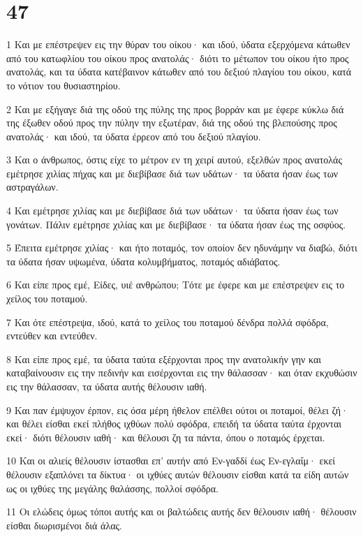 \chapter{47}

\par 1 Και με επέστρεψεν εις την θύραν του οίκου· και ιδού, ύδατα εξερχόμενα κάτωθεν από του κατωφλίου του οίκου προς ανατολάς· διότι το μέτωπον του οίκου ήτο προς ανατολάς, και τα ύδατα κατέβαινον κάτωθεν από του δεξιού πλαγίου του οίκου, κατά το νότιον του θυσιαστηρίου.
\par 2 Και με εξήγαγε διά της οδού της πύλης της προς βορράν και με έφερε κύκλω διά της έξωθεν οδού προς την πύλην την εξωτέραν, διά της οδού της βλεπούσης προς ανατολάς· και ιδού, τα ύδατα έρρεον από του δεξιού πλαγίου.
\par 3 Και ο άνθρωπος, όστις είχε το μέτρον εν τη χειρί αυτού, εξελθών προς ανατολάς εμέτρησε χιλίας πήχας και με διεβίβασε διά των υδάτων· τα ύδατα ήσαν έως των αστραγάλων.
\par 4 Και εμέτρησε χιλίας και με διεβίβασε διά των υδάτων· τα ύδατα ήσαν έως των γονάτων. Πάλιν εμέτρησε χιλίας και με διεβίβασε· τα ύδατα ήσαν έως της οσφύος.
\par 5 Έπειτα εμέτρησε χιλίας· και ήτο ποταμός, τον οποίον δεν ηδυνάμην να διαβώ, διότι τα ύδατα ήσαν υψωμένα, ύδατα κολυμβήματος, ποταμός αδιάβατος.
\par 6 Και είπε προς εμέ, Είδες, υιέ ανθρώπου; Τότε με έφερε και με επέστρεψεν εις το χείλος του ποταμού.
\par 7 Και ότε επέστρεψα, ιδού, κατά το χείλος του ποταμού δένδρα πολλά σφόδρα, εντεύθεν και εντεύθεν.
\par 8 Και είπε προς εμέ, τα ύδατα ταύτα εξέρχονται προς την ανατολικήν γην και καταβαίνουσιν εις την πεδινήν και εισέρχονται εις την θάλασσαν· και όταν εκχυθώσιν εις την θάλασσαν, τα ύδατα αυτής θέλουσιν ιαθή.
\par 9 Και παν έμψυχον έρπον, εις όσα μέρη ήθελον επέλθει ούτοι οι ποταμοί, θέλει ζή· και θέλει είσθαι εκεί πλήθος ιχθύων πολύ σφόδρα, επειδή τα ύδατα ταύτα έρχονται εκεί· διότι θέλουσιν ιαθή· και θέλουσι ζη τα πάντα, όπου ο ποταμός έρχεται.
\par 10 Και οι αλιείς θέλουσιν ίστασθαι επ' αυτήν από Εν-γαδδί έως Εν-εγλαΐμ· εκεί θέλουσιν εξαπλόνει τα δίκτυα· οι ιχθύες αυτών θέλουσιν είσθαι κατά τα είδη αυτών ως οι ιχθύες της μεγάλης θαλάσσης, πολλοί σφόδρα.
\par 11 Οι ελώδεις όμως τόποι αυτής και οι βαλτώδεις αυτής δεν θέλουσιν ιαθή· θέλουσιν είσθαι διωρισμένοι διά άλας.
